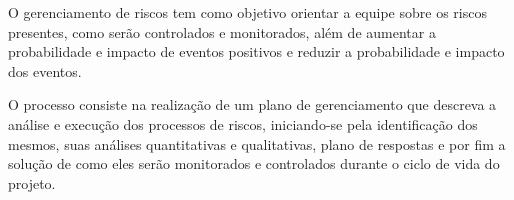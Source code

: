O gerenciamento de riscos tem como objetivo orientar a equipe sobre os riscos presentes, como serão controlados e monitorados, além de aumentar a probabilidade e impacto de eventos positivos e reduzir a probabilidade e impacto dos eventos.

O processo consiste na realização de um plano de gerenciamento que descreva a análise e execução dos processos de riscos, iniciando-se pela identificação dos mesmos, suas análises quantitativas e qualitativas, plano de respostas e por fim a solução de como eles serão monitorados e controlados durante o ciclo de vida do projeto.





